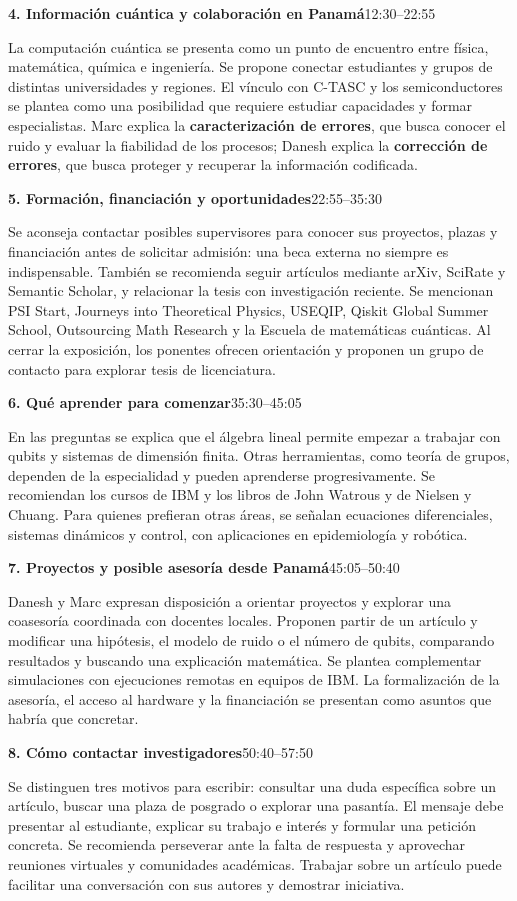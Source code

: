 \documentclass[11pt,a4paper]{article}
\newcommand{\parte}[2]{\par\addvspace{7pt}\Needspace{5\baselineskip}\noindent\textbf{#1}\hfill{\small #2}\par\nobreak}
\begin{document}
\parte{4. Información cuántica y colaboración en Panamá}{12:30--22:55}
La computación cuántica se presenta como un punto de encuentro entre física, matemática, química e ingeniería. Se propone conectar estudiantes y grupos de distintas universidades y regiones. El vínculo con C-TASC y los semiconductores se plantea como una posibilidad que requiere estudiar capacidades y formar especialistas. Marc explica la \textbf{caracterización de errores}, que busca conocer el ruido y evaluar la fiabilidad de los procesos; Danesh explica la \textbf{corrección de errores}, que busca proteger y recuperar la información codificada.

\parte{5. Formación, financiación y oportunidades}{22:55--35:30}
Se aconseja contactar posibles supervisores para conocer sus proyectos, plazas y financiación antes de solicitar admisión: una beca externa no siempre es indispensable. También se recomienda seguir artículos mediante arXiv, SciRate y Semantic Scholar, y relacionar la tesis con investigación reciente. Se mencionan PSI Start, Journeys into Theoretical Physics, USEQIP, Qiskit Global Summer School, Outsourcing Math Research y la Escuela de matemáticas cuánticas. Al cerrar la exposición, los ponentes ofrecen orientación y proponen un grupo de contacto para explorar tesis de licenciatura.

\parte{6. Qué aprender para comenzar}{35:30--45:05}
En las preguntas se explica que el álgebra lineal permite empezar a trabajar con qubits y sistemas de dimensión finita. Otras herramientas, como teoría de grupos, dependen de la especialidad y pueden aprenderse progresivamente. Se recomiendan los cursos de IBM y los libros de John Watrous y de Nielsen y Chuang. Para quienes prefieran otras áreas, se señalan ecuaciones diferenciales, sistemas dinámicos y control, con aplicaciones en epidemiología y robótica.

\parte{7. Proyectos y posible asesoría desde Panamá}{45:05--50:40}
Danesh y Marc expresan disposición a orientar proyectos y explorar una coasesoría coordinada con docentes locales. Proponen partir de un artículo y modificar una hipótesis, el modelo de ruido o el número de qubits, comparando resultados y buscando una explicación matemática. Se plantea complementar simulaciones con ejecuciones remotas en equipos de IBM. La formalización de la asesoría, el acceso al hardware y la financiación se presentan como asuntos que habría que concretar.

\parte{8. Cómo contactar investigadores}{50:40--57:50}
Se distinguen tres motivos para escribir: consultar una duda específica sobre un artículo, buscar una plaza de posgrado o explorar una pasantía. El mensaje debe presentar al estudiante, explicar su trabajo e interés y formular una petición concreta. Se recomienda perseverar ante la falta de respuesta y aprovechar reuniones virtuales y comunidades académicas. Trabajar sobre un artículo puede facilitar una conversación con sus autores y demostrar iniciativa.
\end{document}
